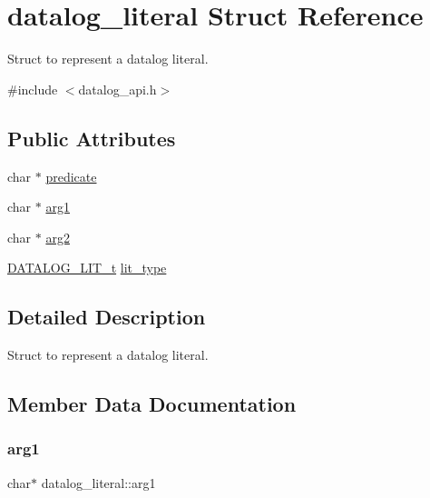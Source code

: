 \hypertarget{structdatalog__literal}{}\section{datalog\+\_\+literal Struct Reference}
\label{structdatalog__literal}


Struct to represent a datalog literal.  




{\ttfamily \#include $<$datalog\+\_\+api.\+h$>$}

\subsection*{Public Attributes}
\begin{DoxyCompactItemize}
\item 
char $\ast$ \hyperlink{structdatalog__literal_aad44475a0e606d9fd9c5e7aae3667412}{predicate}
\item 
char $\ast$ \hyperlink{structdatalog__literal_aac5aacf6ea0e280418cbf61b700a5239}{arg1}
\item 
char $\ast$ \hyperlink{structdatalog__literal_a38e9dc36488ad4014bfb52027cc65cc9}{arg2}
\item 
\hyperlink{datalog__api_8h_ad27ac7b01e9690a8c6d1bd37e131a421}{D\+A\+T\+A\+L\+O\+G\+\_\+\+L\+I\+T\+\_\+t} \hyperlink{structdatalog__literal_a7fad52c17a15a69937de4e78746be12c}{lit\+\_\+type}
\end{DoxyCompactItemize}


\subsection{Detailed Description}
Struct to represent a datalog literal. 

\subsection{Member Data Documentation}
\mbox{\label{structdatalog__literal_aac5aacf6ea0e280418cbf61b700a5239}} 
\subsubsection{\texorpdfstring{arg1}{arg1}}
{\footnotesize\ttfamily char$\ast$ datalog\+\_\+literal\+::arg1}

